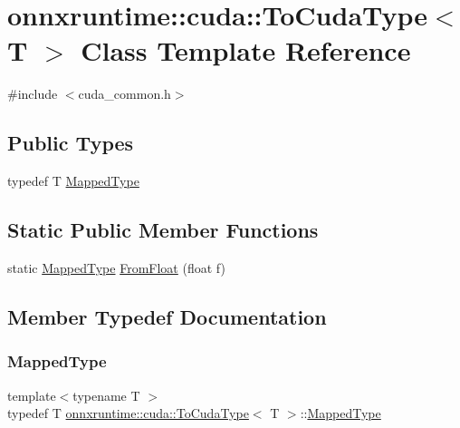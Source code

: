 \hypertarget{classonnxruntime_1_1cuda_1_1ToCudaType}{}\section{onnxruntime\+:\+:cuda\+:\+:To\+Cuda\+Type$<$ T $>$ Class Template Reference}
\label{classonnxruntime_1_1cuda_1_1ToCudaType}


{\ttfamily \#include $<$cuda\+\_\+common.\+h$>$}

\subsection*{Public Types}
\begin{DoxyCompactItemize}
\item 
typedef T \mbox{\hyperlink{classonnxruntime_1_1cuda_1_1ToCudaType_a22769ed832bbccc67be1e6ed760598c6}{Mapped\+Type}}
\end{DoxyCompactItemize}
\subsection*{Static Public Member Functions}
\begin{DoxyCompactItemize}
\item 
static \mbox{\hyperlink{classonnxruntime_1_1cuda_1_1ToCudaType_a22769ed832bbccc67be1e6ed760598c6}{Mapped\+Type}} \mbox{\hyperlink{classonnxruntime_1_1cuda_1_1ToCudaType_aca884727366d2b420efe93bb0ed80752}{From\+Float}} (float f)
\end{DoxyCompactItemize}


\subsection{Member Typedef Documentation}
\mbox{\label{classonnxruntime_1_1cuda_1_1ToCudaType_a22769ed832bbccc67be1e6ed760598c6}} 
\subsubsection{\texorpdfstring{Mapped\+Type}{MappedType}}
{\footnotesize\ttfamily template$<$typename T $>$ \\
typedef T \mbox{\hyperlink{classonnxruntime_1_1cuda_1_1ToCudaType}{onnxruntime\+::cuda\+::\+To\+Cuda\+Type}}$<$ T $>$\+::\mbox{\hyperlink{classonnxruntime_1_1cuda_1_1ToCudaType_a22769ed832bbccc67be1e6ed760598c6}{Mapped\+Type}}}



